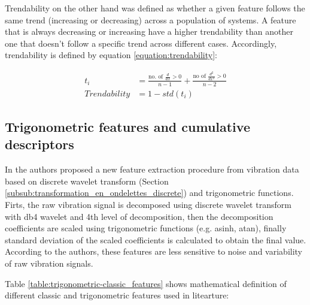 Trendability on the other hand was defined as whether a given feature follows the same trend (increasing or decreasing) across a population of systems. A feature that is always decreasing or increasing have a higher trendability than another one that doesn't follow a specific trend across different cases. Accordingly, trendability is defined by equation \ref{equation:trendability}:  

\begin{equation}
	\begin{aligned}
		t_i&= \frac{\text{no. of }\frac{d}{dx}>0}{n-1}+\frac{\text{no of } \frac{d^2}{dx^2}>0}{n-2}\\
Trendability&=1-std(t_i)
	\end{aligned}
	\label{equation:trendability}
\end{equation}

\subsection{Trigonometric features and cumulative descriptors}%
\label{sub:trigonometric_features}
In \cite{javed2013} the authors proposed a new feature extraction procedure from vibration data based on discrete wavelet transform (Section \ref{subsub:transformation_en_ondelettes_discrete}) and trigonometric functions. Firts, the raw vibration signal is decomposed using discrete wavelet transform with db4 wavelet and 4th level of decomposition, then the decomposition coefficients are scaled using trigonometric functions (e.g. asinh, atan), finally standard deviation of the scaled coefficients is calculated to obtain the final value. According to the authors, these features are less sensitive to noise and variability of raw vibration signals. 

Table \ref{table:trigonometric-classic_features} shows mathematical definition of different classic and trigonometric features used in litearture:

